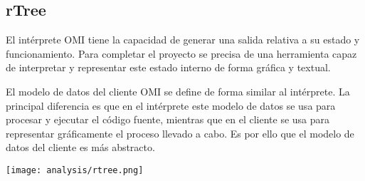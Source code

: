 \subsection {rTree} 
El intérprete OMI tiene la capacidad de generar una salida relativa
a su estado y funcionamiento. Para completar el proyecto se precisa 
de una herramienta capaz de interpretar y representar este estado 
interno de forma gráfica y textual. 

El modelo de datos del cliente OMI se define de forma similar al intérprete.
La principal diferencia es que en el intérprete este modelo de datos se usa para procesar y 
ejecutar el código fuente, mientras que en el cliente se usa para representar gráficamente 
el proceso llevado a cabo. Es por ello que el modelo de datos del cliente es más abstracto. 

\begin{center}
\texttt{[image: analysis/rtree.png]} 
\end{center}

